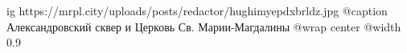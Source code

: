  
 
 
 
 

\ifcmt
  ig https://mrpl.city/uploads/posts/redactor/hughimyepdxbrldz.jpg
	@caption Александровский сквер и Церковь Св. Марии-Магдалины
  @wrap center
  @width 0.9
\fi
